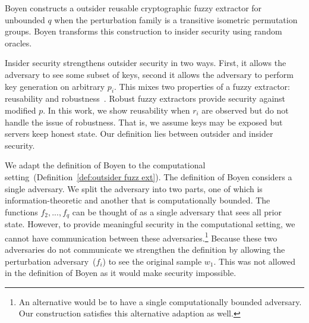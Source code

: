 \documentclass[11pt]{article}
\newcommand{\defref}[1]{\mbox{Definition~\ref{#1}}}
\newcommand{\consref}[1]{\mbox{Construction~\ref{#1}}}
\newcommand{\authnote}[2]{{\textcolor{red}{\textsf{#1 notes: }\textcolor{blue}{ #2}}\marginpar{\textcolor{red}{\textbf{!!!!!}}}}}
\newcommand{\authnote}[2]{}
\newcommand{\lnote}[1]{{\authnote{Leo}{#1}}}
\begin{document}
Boyen constructs a outsider reusable cryptographic fuzzy extractor for unbounded $q$ when the perturbation family is a transitive isometric permutation groups. Boyen transforms this construction to insider security using random oracles. %

Insider security strengthens outsider security in two ways.  First, it allows the adversary to see some subset of keys, second it allows the adversary to perform key generation on arbitrary $p_i$.  This mixes two properties of a fuzzy extractor:  reusability and robustness~\cite{dkrs2006}.  Robust fuzzy extractors provide security against modified $p$.  
In this work, we show reusability when $r_i$ are observed but do not handle the issue of robustness.  That is, we assume keys may be exposed but servers keep honest state.  Our definition lies between outsider and insider security.

We adapt the definition of Boyen to the computational setting~(\defref{def:outsider fuzz ext}).  
The definition of Boyen considers a single adversary.  We split the adversary into two parts, one of which is information-theoretic and another that is computationally bounded.  The functions $f_2,..., f_q$ can be thought of as a single adversary that sees all prior state.  However, to provide meaningful security in the computational setting, we cannot have communication between these adversaries.\footnote{An alternative would be to have a single computationally bounded adversary.  Our construction satisfies this alternative adaption as well.}
Because these two adversaries do not communicate we strengthen the definition by allowing the perturbation adversary~($f_i$) to see the original sample $w_1$.  This was not allowed in the definition of Boyen as it would make security impossible.

\end{document}
